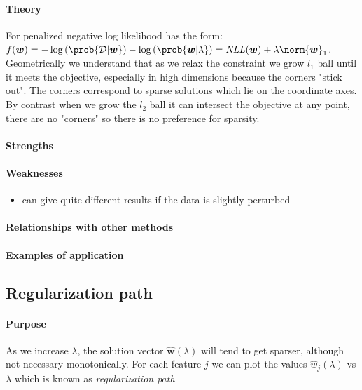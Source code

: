 \paragraph{Theory}
For penalized negative log likelihood has the form: $f(\bm{w}) = -\log\left(\prob{
\mathcal{D}|\bm{w}}\right) - \log\left(\prob{\bm{w}|\lambda}\right) = \text{\emph{NLL}}
(\bm{w}) + \lambda\norm{\bm{w}}_{1}$.\\
Geometrically we understand that as we relax the constraint we grow $l_{1}$ ball until
it meets the objective,  especially in high dimensions because the corners "stick
out". The corners correspond to sparse solutions which lie on the coordinate axes. By
contrast when we grow the $l_{2}$ ball it can intersect the objective at any point, 
there are no "corners" so there is no preference for sparsity. 
\paragraph{Strengths}

\paragraph{Weaknesses}
\begin{itemize}
    \item can give quite different results if the data is slightly perturbed
\end{itemize}
\paragraph{Relationships with other methods}
\paragraph{Examples of application}

\subsection{Regularization path}
\paragraph{Purpose}
As we increase $\lambda$, the solution vector $\hat{\bm{w}}(\lambda)$ will tend to get
sparser, although not necessary monotonically. For each feature $j$ we can plot the 
values $\hat{w}_{j}(\lambda)$ vs $\lambda$ which is known as \emph{regularization path}
